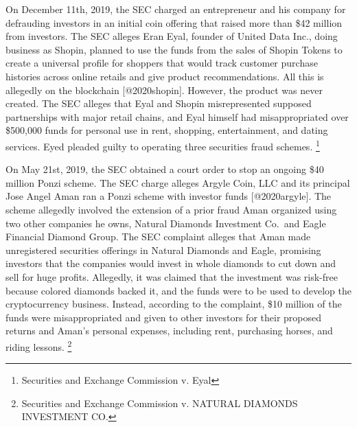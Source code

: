 On December 11th, 2019, the SEC charged an entrepreneur and his company for
defrauding investors in an initial coin offering that raised more than \$42
million from investors. The SEC alleges Eran Eyal, founder of United Data Inc.,
doing business as Shopin, planned to use the funds from the sales of Shopin
Tokens to create a universal profile for shoppers that would track customer
purchase histories across online retails and give product recommendations. All
this is allegedly on the blockchain [@2020shopin]. However, the product was
never created. The SEC alleges that Eyal and Shopin misrepresented supposed
partnerships with major retail chains, and Eyal himself had misappropriated over
\$500,000 funds for personal use in rent, shopping, entertainment, and dating
services. Eyed pleaded guilty to operating three securities fraud schemes.
\footnote{Securities and Exchange Commission v. Eyal}

On May 21st, 2019, the SEC obtained a court order to stop an ongoing \$40 million Ponzi scheme. The SEC charge alleges Argyle Coin, LLC and its principal Jose Angel Aman ran a Ponzi scheme with investor funds [@2020argyle]. The scheme allegedly involved the extension of a prior fraud Aman organized using two other companies he owns, Natural Diamonds Investment Co. and Eagle Financial Diamond Group. The SEC complaint alleges that Aman made unregistered securities offerings in Natural Diamonds and Eagle, promising investors that the companies would invest in whole diamonds to cut down and sell for huge profits. Allegedly, it was claimed that the investment was risk-free because colored diamonds backed it, and the funds were to be used to develop the cryptocurrency business. Instead, according to the complaint, \$10 million of the funds were misappropriated and given to other investors for their proposed returns and Aman's personal expenses, including rent, purchasing horses, and riding lessons. \footnote{Securities and Exchange Commission v. NATURAL DIAMONDS INVESTMENT CO.}

